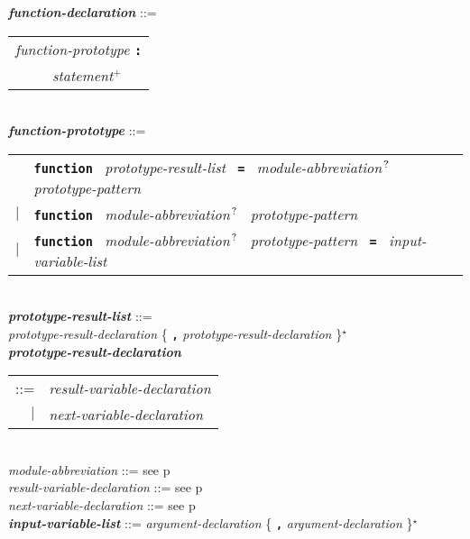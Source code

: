 \documentclass[12pt]{article}
\newcommand{\TT}[1]{{\tt \bfseries #1}}
\newcommand{\STAR}{{\Large $^\star$}}
\newcommand{\PLUS}[1][]{{$^{+#1}$}}
\newcommand{\QMARK}{{$^{\,\mbox{\footnotesize ?}}$}}
\newcommand{\ttkey}[1]{{\tt \bfseries #1}}
\newcommand{\emkey}[1]{{\em \bfseries #1}}
\newcommand{\pagref}[1]{p\pageref{#1}}
\newenvironment{indpar}[1][0.3in]%
	{\begin{list}{}%
		     {\setlength{\itemsep}{0in}%
		      \setlength{\topsep}{0in}%
		      \setlength{\parsep}{1ex}%
		      \setlength{\labelwidth}{#1}%
		      \setlength{\leftmargin}{#1}%
		      \addtolength{\leftmargin}{\labelsep}}%
	 \item}%
	{\end{list}}
\begin{document}
\begin{indpar}
\emkey{function-declaration}\label{FUNCTION-DECLARATION}
    ::= \begin{tabular}[t]{l}
        {\em function-prototype} \TT{:} \\
	\TT{~~~~~}{\em statement}\PLUS{}
	\end{tabular}
\\[2ex]
\emkey{function-prototype}\label{FUNCTION-PROTOTYPE} ::= \\
\hspace*{0.25in}
    \begin{tabular}[t]{@{}rl}
        & \ttkey{function}~
          {\em prototype-result-list}~ \TT{=}~
          {\em module-abbreviation}\QMARK{}~
	                {\em prototype-pattern} \\
    $|$ & \ttkey{function}~ {\em module-abbreviation}\QMARK{}~
                           {\em prototype-pattern} \\
    $|$ & \ttkey{function}~ {\em module-abbreviation}\QMARK{}~
                           {\em prototype-pattern}~ \TT{=}~
                           {\em input-variable-list} \\
    \end{tabular}
\\[0.5ex]
\emkey{prototype-result-list} ::= \\
\hspace*{0.5in}
    {\em prototype-result-declaration}
    \{ \TT{,} {\em prototype-result-declaration} \}\STAR{}
\\[0.5ex]
\emkey{prototype-result-declaration} \\
\hspace*{1in}\begin{tabular}[t]{rl}
    ::= & {\em result-variable-declaration} \\
    $|$ & {\em next-variable-declaration} \\
    \end{tabular}
\\[0.5ex]
{\em module-abbreviation} ::= see \pagref{MODULE-ABBREVIATION}
\\[0.5ex]
{\em result-variable-declaration} ::= see \pagref{RESULT-VARIABLE-DECLARATION}
\\[0.5ex]
{\em next-variable-declaration} ::= see \pagref{NEXT-VARIABLE-DECLARATION}
\\[0.5ex]
\emkey{input-variable-list}
    ::= {\em argument-declaration}
                 \{ \TT{,} {\em argument-declaration} \}\STAR{}
\\[0.5ex]

\end{indpar}
\end{document}
